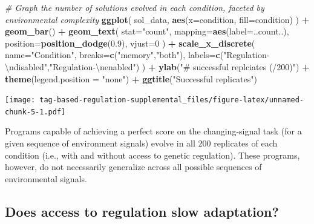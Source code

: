 \documentclass[
]{book}
\newenvironment{Shaded}{\begin{snugshade}}{\end{snugshade}}
\newcommand{\CharTok}[1]{\textcolor[rgb]{0.31,0.60,0.02}{#1}}
\newcommand{\CommentTok}[1]{\textcolor[rgb]{0.56,0.35,0.01}{\textit{#1}}}
\newcommand{\DataTypeTok}[1]{\textcolor[rgb]{0.13,0.29,0.53}{#1}}
\newcommand{\DecValTok}[1]{\textcolor[rgb]{0.00,0.00,0.81}{#1}}
\newcommand{\FloatTok}[1]{\textcolor[rgb]{0.00,0.00,0.81}{#1}}
\newcommand{\KeywordTok}[1]{\textcolor[rgb]{0.13,0.29,0.53}{\textbf{#1}}}
\newcommand{\NormalTok}[1]{#1}
\newcommand{\OperatorTok}[1]{\textcolor[rgb]{0.81,0.36,0.00}{\textbf{#1}}}
\newcommand{\StringTok}[1]{\textcolor[rgb]{0.31,0.60,0.02}{#1}}
\begin{document}
\begin{Shaded}
\begin{Highlighting}[]
\CommentTok{\# Graph the number of solutions evolved in each condition, faceted by environmental complexity}
\KeywordTok{ggplot}\NormalTok{( sol\_data, }\KeywordTok{aes}\NormalTok{(}\DataTypeTok{x=}\NormalTok{condition, }\DataTypeTok{fill=}\NormalTok{condition) ) }\OperatorTok{+}
\StringTok{  }\KeywordTok{geom\_bar}\NormalTok{() }\OperatorTok{+}
\StringTok{  }\KeywordTok{geom\_text}\NormalTok{(}
    \DataTypeTok{stat=}\StringTok{"count"}\NormalTok{,}
    \DataTypeTok{mapping=}\KeywordTok{aes}\NormalTok{(}\DataTypeTok{label=}\NormalTok{..count..),}
    \DataTypeTok{position=}\KeywordTok{position\_dodge}\NormalTok{(}\FloatTok{0.9}\NormalTok{),}
    \DataTypeTok{vjust=}\DecValTok{0}
\NormalTok{  ) }\OperatorTok{+}
\StringTok{  }\KeywordTok{scale\_x\_discrete}\NormalTok{(}
    \DataTypeTok{name=}\StringTok{"Condition"}\NormalTok{,}
    \DataTypeTok{breaks=}\KeywordTok{c}\NormalTok{(}\StringTok{"memory"}\NormalTok{,}\StringTok{"both"}\NormalTok{),}
    \DataTypeTok{labels=}\KeywordTok{c}\NormalTok{(}\StringTok{"Regulation{-}}\CharTok{\textbackslash{}n}\StringTok{disabled"}\NormalTok{,}\StringTok{"Regulation{-}}\CharTok{\textbackslash{}n}\StringTok{enabled"}\NormalTok{)}
\NormalTok{  ) }\OperatorTok{+}
\StringTok{  }\KeywordTok{ylab}\NormalTok{(}\StringTok{"\# successful replciates (/200)"}\NormalTok{) }\OperatorTok{+}
\StringTok{  }\KeywordTok{theme}\NormalTok{(}\DataTypeTok{legend.position =} \StringTok{"none"}\NormalTok{) }\OperatorTok{+}
\StringTok{  }\KeywordTok{ggtitle}\NormalTok{(}\StringTok{"Successful replicates"}\NormalTok{)}
\end{Highlighting}
\end{Shaded}

\texttt{[image: tag-based-regulation-supplemental\_files/figure-latex/unnamed-chunk-5-1.pdf]}

Programs capable of achieving a perfect score on the changing-signal task (for a given sequence of environment signals) evolve in all 200 replicates of each condition (i.e., with and without access to genetic regulation).
These programs, however, do not necessarily generalize across all possible sequences of environmental signals.

\hypertarget{does-access-to-regulation-slow-adaptation}{%
\subsection{Does access to regulation slow adaptation?}\label{does-access-to-regulation-slow-adaptation}}
\end{document}

